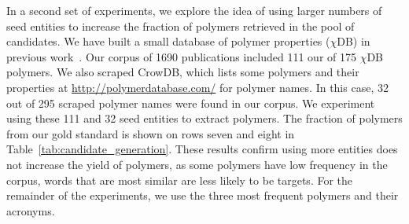 In a second set of experiments, we explore the idea of using larger numbers of seed entities to increase the fraction of polymers retrieved in the pool of candidates.
We have built a small database of polymer properties ($\chi$DB) in previous work~\cite{tchoua2016hybrid,tchoua2016hybridi}. 
Our corpus of \num{1690} publications included 111 our of 175 $\chi$DB polymers.  
We also scraped CrowDB, which lists some polymers and their properties at \url{http://polymerdatabase.com/} for polymer names.
In this case, 32 out of 295 scraped polymer names were found in our corpus.
We experiment using these 111 and 32 seed entities to extract polymers. The fraction of polymers from our gold standard is shown on rows seven and eight in Table~\ref{tab:candidate_generation}.
These results confirm using more entities does not increase the yield of polymers, as some polymers have low frequency in the corpus, words that are most similar are less likely to be targets.
For the remainder of the experiments, we use the three most frequent polymers and their acronyms. 


